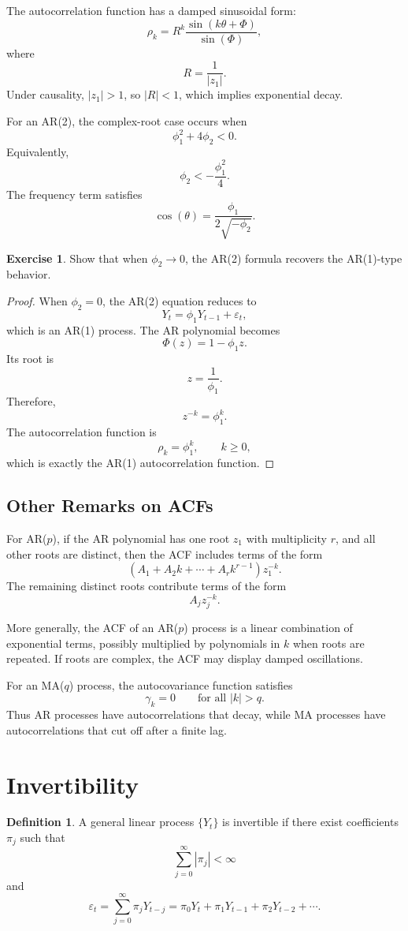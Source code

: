 \documentclass[12pt,oneside]{book}
\numberwithin{equation}{section}
\theoremstyle{definition}
\newtheorem{definition}{Definition}[section]
\newtheorem{exercise}{Exercise}[section]
\theoremstyle{plain}
\theoremstyle{remark}
\begin{document}
The autocorrelation function has a damped sinusoidal form:
\[
\rho_k
=
R^k\frac{\sin(k\theta+\Phi)}{\sin(\Phi)},
\]
where
\[
R=\frac{1}{|z_1|}.
\]
Under causality, $|z_1|>1$, so $|R|<1$, which implies exponential decay.

For an AR(2), the complex-root case occurs when
\[
\phi_1^2+4\phi_2<0.
\]
Equivalently,
\[
\phi_2<-\frac{\phi_1^2}{4}.
\]
The frequency term satisfies
\[
\cos(\theta)
=
\frac{\phi_1}{2\sqrt{-\phi_2}}.
\]

\begin{exercise}
Show that when $\phi_2\to 0$, the AR(2) formula recovers the AR(1)-type behavior.
\end{exercise}

\begin{proof}
When $\phi_2=0$, the AR(2) equation reduces to
\[
Y_t=\phi_1Y_{t-1}+\varepsilon_t,
\]
which is an AR(1) process. The AR polynomial becomes
\[
\Phi(z)=1-\phi_1z.
\]
Its root is
\[
z=\frac{1}{\phi_1}.
\]
Therefore,
\[
z^{-k}=\phi_1^k.
\]
The autocorrelation function is
\[
\rho_k=\phi_1^k,
\qquad k\geq 0,
\]
which is exactly the AR(1) autocorrelation function.
\end{proof}

\subsection*{Other Remarks on ACFs}

For AR($p$), if the AR polynomial has one root $z_1$ with multiplicity $r$, and all other roots are distinct, then the ACF includes terms of the form
\[
(A_1+A_2k+\cdots+A_rk^{r-1})z_1^{-k}.
\]
The remaining distinct roots contribute terms of the form
\[
A_jz_j^{-k}.
\]

More generally, the ACF of an AR($p$) process is a linear combination of exponential terms, possibly multiplied by polynomials in $k$ when roots are repeated. If roots are complex, the ACF may display damped oscillations.

For an MA($q$) process, the autocovariance function satisfies
\[
\gamma_k=0
\qquad
\text{for all } |k|>q.
\]
Thus AR processes have autocorrelations that decay, while MA processes have autocorrelations that cut off after a finite lag.

\section{Invertibility}

\begin{definition}
A general linear process $\{Y_t\}$ is invertible if there exist coefficients $\pi_j$ such that
\[
\sum_{j=0}^{\infty}|\pi_j|<\infty
\]
and
\[
\varepsilon_t
=
\sum_{j=0}^{\infty}\pi_jY_{t-j}
=
\pi_0Y_t+\pi_1Y_{t-1}+\pi_2Y_{t-2}+\cdots.
\]
\end{definition}
\end{document}
